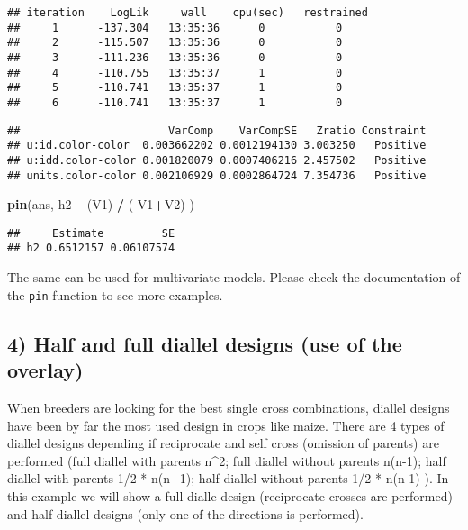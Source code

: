 \documentclass[]{article}
\newenvironment{Shaded}{\begin{snugshade}}{\end{snugshade}}
\newcommand{\KeywordTok}[1]{\textcolor[rgb]{0.13,0.29,0.53}{\textbf{#1}}}
\newcommand{\StringTok}[1]{\textcolor[rgb]{0.31,0.60,0.02}{#1}}
\newcommand{\OperatorTok}[1]{\textcolor[rgb]{0.81,0.36,0.00}{\textbf{#1}}}
\newcommand{\NormalTok}[1]{#1}
\begin{document}
\begin{verbatim}
## iteration    LogLik     wall    cpu(sec)   restrained
##     1      -137.304   13:35:36      0           0
##     2      -115.507   13:35:36      0           0
##     3      -111.236   13:35:36      0           0
##     4      -110.755   13:35:37      1           0
##     5      -110.741   13:35:37      1           0
##     6      -110.741   13:35:37      1           0
\end{verbatim}

\begin{Shaded}
\end{Shaded}

\begin{verbatim}
##                       VarComp    VarCompSE   Zratio Constraint
## u:id.color-color  0.003662202 0.0012194130 3.003250   Positive
## u:idd.color-color 0.001820079 0.0007406216 2.457502   Positive
## units.color-color 0.002106929 0.0002864724 7.354736   Positive
\end{verbatim}

\begin{Shaded}
\begin{Highlighting}[]
\KeywordTok{pin}\NormalTok{(ans, h2 }\OperatorTok{~}\StringTok{ }\NormalTok{(V1) }\OperatorTok{/}\StringTok{ }\NormalTok{( V1}\OperatorTok{+}\NormalTok{V2) )}
\end{Highlighting}
\end{Shaded}

\begin{verbatim}
##     Estimate         SE
## h2 0.6512157 0.06107574
\end{verbatim}

The same can be used for multivariate models. Please check the
documentation of the \texttt{pin} function to see more examples.

\subsection{4) Half and full diallel designs (use of the
overlay)}\label{half-and-full-diallel-designs-use-of-the-overlay}

When breeders are looking for the best single cross combinations,
diallel designs have been by far the most used design in crops like
maize. There are 4 types of diallel designs depending if reciprocate and
self cross (omission of parents) are performed (full diallel with
parents n\^{}2; full diallel without parents n(n-1); half diallel with
parents 1/2 * n(n+1); half diallel without parents 1/2 * n(n-1) ). In
this example we will show a full dialle design (reciprocate crosses are
performed) and half diallel designs (only one of the directions is
performed).
\end{document}

